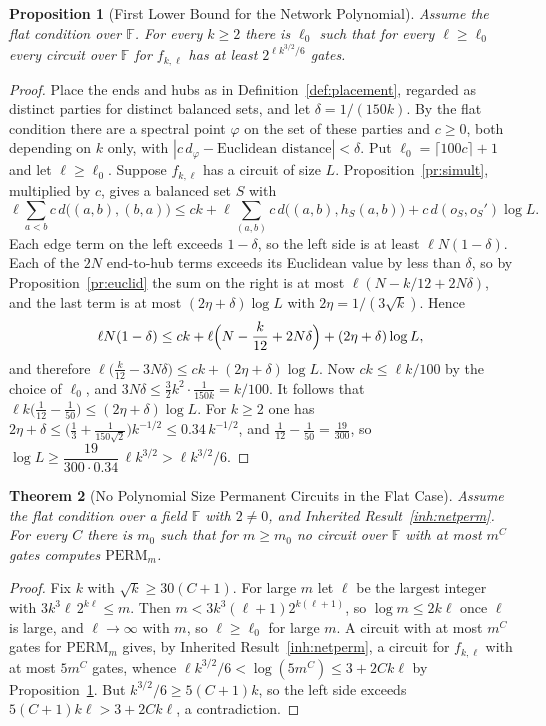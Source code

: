 \documentclass[11pt,letterpaper]{report}
\theoremstyle{plain}
\newtheorem{theorem}{Theorem}[chapter]
\newtheorem{proposition}[theorem]{Proposition}
\theoremstyle{definition}
\theoremstyle{remark}
\begin{document}
\begin{proposition}[First Lower Bound for the Network Polynomial]\label{pr:firstlb}
Assume the flat condition over $\mathbb F$. For every $k\ge2$ there is $\ell_0$ such that for every $\ell\ge\ell_0$ every circuit over $\mathbb F$ for $f_{k,\ell}$ has at least $2^{\ell k^{3/2}/6}$ gates.
\end{proposition}
\begin{proof}
Place the ends and hubs as in Definition~\ref{def:placement}, regarded as distinct parties for distinct balanced sets, and let $\delta=1/(150k)$. By the flat condition there are a spectral point $\varphi$ on the set of these parties and $c\ge0$, both depending on $k$ only, with $|c\,d_\varphi-\text{Euclidean distance}|<\delta$. Put $\ell_0=\lceil100c\rceil+1$ and let $\ell\ge\ell_0$. Suppose $f_{k,\ell}$ has a circuit of size $L$. Proposition~\ref{pr:simult}, multiplied by $c$, gives a balanced set $S$ with
\[
\ell\sum_{a<b}c\,d\bigl((a,b),(b,a)\bigr)\le ck+\ell\sum_{(a,b)}c\,d\bigl((a,b),h_S(a,b)\bigr)+c\,d(o_S,o_S')\log L.
\]
Each edge term on the left exceeds $1-\delta$, so the left side is at least $\ell N(1-\delta)$. Each of the $2N$ end-to-hub terms exceeds its Euclidean value by less than $\delta$, so by Proposition~\ref{pr:euclid} the sum on the right is at most $\ell(N-k/12+2N\delta)$, and the last term is at most $(2\eta+\delta)\log L$ with $2\eta=1/(3\sqrt k)$. Hence
\[
\ell N(1-\delta)\le ck+\ell\Bigl(N-\frac k{12}+2N\delta\Bigr)+(2\eta+\delta)\log L,
\]
and therefore $\ell\bigl(\tfrac k{12}-3N\delta\bigr)\le ck+(2\eta+\delta)\log L$. Now $ck\le\ell k/100$ by the choice of $\ell_0$, and $3N\delta\le\tfrac32k^2\cdot\tfrac1{150k}=k/100$. It follows that $\ell k\bigl(\tfrac1{12}-\tfrac1{50}\bigr)\le(2\eta+\delta)\log L$. For $k\ge2$ one has $2\eta+\delta\le\bigl(\tfrac13+\tfrac1{150\sqrt2}\bigr)k^{-1/2}\le0.34\,k^{-1/2}$, and $\tfrac1{12}-\tfrac1{50}=\tfrac{19}{300}$, so $\log L\ge\dfrac{19}{300\cdot0.34}\,\ell k^{3/2}>\ell k^{3/2}/6$.
\end{proof}

\begin{theorem}[No Polynomial Size Permanent Circuits in the Flat Case]\label{th:nopolyflat}
Assume the flat condition over a field $\mathbb F$ with $2\ne0$, and Inherited Result~\ref{inh:netperm}. For every $C$ there is $m_0$ such that for $m\ge m_0$ no circuit over $\mathbb F$ with at most $m^{C}$ gates computes $\mathrm{PERM}_m$.
\end{theorem}
\begin{proof}
Fix $k$ with $\sqrt k\ge30(C+1)$. For large $m$ let $\ell$ be the largest integer with $3k^3\ell\,2^{k\ell}\le m$. Then $m<3k^3(\ell+1)2^{k(\ell+1)}$, so $\log m\le2k\ell$ once $\ell$ is large, and $\ell\to\infty$ with $m$, so $\ell\ge\ell_0$ for large $m$. A circuit with at most $m^C$ gates for $\mathrm{PERM}_m$ gives, by Inherited Result~\ref{inh:netperm}, a circuit for $f_{k,\ell}$ with at most $5m^C$ gates, whence $\ell k^{3/2}/6<\log(5m^C)\le3+2Ck\ell$ by Proposition~\ref{pr:firstlb}. But $k^{3/2}/6\ge5(C+1)k$, so the left side exceeds $5(C+1)k\ell>3+2Ck\ell$, a contradiction.
\end{proof}
\end{document}
